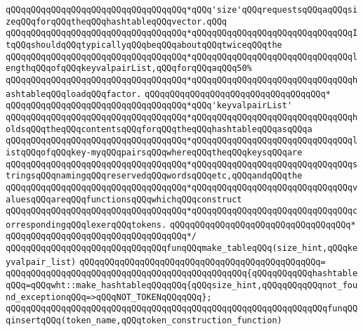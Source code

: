 \verb|qQQqqQQqqQQqqQQqqQQqqQQqqQQqqQQqqQQq*qQQq'size'qQQqrequestsqQQqaqQQqsizeqQQqforqQQqtheqQQqhashtableqQQqvector.qQQq|\newline
\verb|qQQqqQQqqQQqqQQqqQQqqQQqqQQqqQQqqQQq*qQQqqQQqqQQqqQQqqQQqqQQqqQQqqQQqItqQQqshouldqQQqtypicallyqQQqbeqQQqaboutqQQqtwiceqQQqthe|\newline
\verb|qQQqqQQqqQQqqQQqqQQqqQQqqQQqqQQqqQQq*qQQqqQQqqQQqqQQqqQQqqQQqqQQqqQQqlengthqQQqofqQQqkeyvalpairList,qQQqforqQQqaqQQq50%|\newline
\verb|qQQqqQQqqQQqqQQqqQQqqQQqqQQqqQQqqQQq*qQQqqQQqqQQqqQQqqQQqqQQqqQQqqQQqhashtableqQQqloadqQQqfactor.|\newline
\verb|qQQqqQQqqQQqqQQqqQQqqQQqqQQqqQQqqQQq*|\newline
\verb|qQQqqQQqqQQqqQQqqQQqqQQqqQQqqQQqqQQq*qQQq'keyvalpairList'|\newline
\verb|qQQqqQQqqQQqqQQqqQQqqQQqqQQqqQQqqQQq*qQQqqQQqqQQqqQQqqQQqqQQqqQQqqQQqholdsqQQqtheqQQqcontentsqQQqforqQQqtheqQQqhashtableqQQqasqQQqa|\newline
\verb|qQQqqQQqqQQqqQQqqQQqqQQqqQQqqQQqqQQq*qQQqqQQqqQQqqQQqqQQqqQQqqQQqqQQqlistqQQqofqQQqkey-myqQQqpairsqQQqwhereqQQqtheqQQqkeysqQQqare|\newline
\verb|qQQqqQQqqQQqqQQqqQQqqQQqqQQqqQQqqQQq*qQQqqQQqqQQqqQQqqQQqqQQqqQQqqQQqstringsqQQqnamingqQQqreservedqQQqwordsqQQqetc,qQQqandqQQqthe|\newline
\verb|qQQqqQQqqQQqqQQqqQQqqQQqqQQqqQQqqQQq*qQQqqQQqqQQqqQQqqQQqqQQqqQQqqQQqvaluesqQQqareqQQqfunctionsqQQqwhichqQQqconstruct|\newline
\verb|qQQqqQQqqQQqqQQqqQQqqQQqqQQqqQQqqQQq*qQQqqQQqqQQqqQQqqQQqqQQqqQQqqQQqcorrespondingqQQqlexerqQQqtokens.|\newline
\verb|qQQqqQQqqQQqqQQqqQQqqQQqqQQqqQQqqQQq*|\newline
\verb|qQQqqQQqqQQqqQQqqQQqqQQqqQQqqQQqqQQq*/|\newline
\verb|qQQqqQQqqQQqqQQqqQQqqQQqqQQqqQQqfunqQQqmake_tableqQQq(size_hint,qQQqkeyvalpair_list)|\newline
\verb|qQQqqQQqqQQqqQQqqQQqqQQqqQQqqQQqqQQqqQQqqQQqqQQq=|\newline
\verb|qQQqqQQqqQQqqQQqqQQqqQQqqQQqqQQqqQQqqQQqqQQqqQQq{qQQqqQQqqQQqhashtableqQQq=qQQqwht::make_hashtableqQQqqQQq{qQQqsize_hint,qQQqqQQqqQQqnot_found_exceptionqQQq=>qQQqNOT_TOKENqQQqqQQq};|\newline
\newline
\verb|qQQqqQQqqQQqqQQqqQQqqQQqqQQqqQQqqQQqqQQqqQQqqQQqqQQqqQQqqQQqqQQqfunqQQqinsertqQQq(token_name,qQQqtoken_construction_function)|\newline
